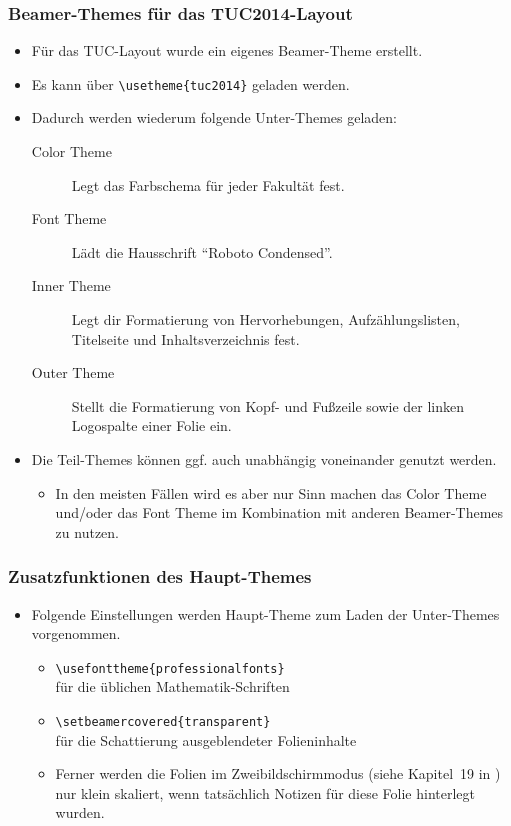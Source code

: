 \begin{frame}[containsverbatim]
\frametitle{Beamer-Themes für das TUC2014-Layout}

\begin{itemize}
\item Für das TUC-Layout wurde ein eigenes Beamer-Theme erstellt.
\item Es kann über \lstinline[language={[LaTeX]TeX}]+\usetheme{tuc2014}+ geladen werden.
\item Dadurch werden wiederum folgende Unter-Themes geladen:
  \begin{description}
  \item[Color Theme] Legt das Farbschema für jeder Fakultät fest.
  \item[Font Theme]  Lädt die Hausschrift "`Roboto Condensed"'.
  \item[Inner Theme] Legt dir Formatierung von Hervorhebungen, Aufzählungslisten,
                     Titelseite und Inhaltsverzeichnis fest.
  \item[Outer Theme] Stellt die Formatierung von Kopf- und Fußzeile sowie der
                     linken Logospalte einer Folie ein.
  \end{description}

\bigskip

\item Die Teil-Themes können ggf. auch unabhängig voneinander genutzt werden.
  \begin{itemize}
  \item In den meisten Fällen wird es aber nur Sinn machen das Color Theme
        und/oder das Font Theme im Kombination mit anderen Beamer-Themes zu
        nutzen.
  \end{itemize}
\end{itemize}
\end{frame}


\begin{frame}[containsverbatim]
\frametitle{Zusatzfunktionen des Haupt-Themes}

\begin{itemize}
\item Folgende Einstellungen werden Haupt-Theme  zum
      Laden der Unter-Themes vorgenommen.
  \begin{itemize}
  \item \lstinline[language={[LaTeX]TeX}]+\usefonttheme{professionalfonts}+ \\
        für die üblichen Mathematik-Schriften
  \smallskip
  \item \lstinline[language={[LaTeX]TeX}]+\setbeamercovered{transparent}+ \\
        für die Schattierung ausgeblendeter Folieninhalte
  \smallskip
  \item Ferner werden die Folien im Zweibildschirmmodus (siehe Kapitel~19
        in \cite{beamerguide}) nur klein skaliert, wenn tatsächlich Notizen
        für diese Folie hinterlegt wurden.
  \end{itemize}
\end{itemize}
\end{frame}

